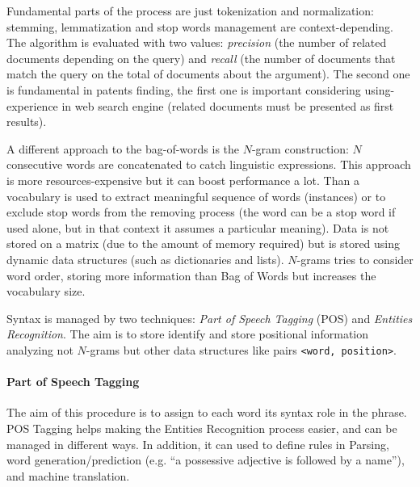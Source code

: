 \documentclass[11pt, a4page]{article}
\begin{document}
Fundamental parts of the process are just tokenization and normalization: stemming, lemmatization and stop words management are context-depending.
The algorithm is evaluated with two values: \textit{precision} (the number of related documents depending on the query) and \textit{recall} (the number of documents that match the query on the total of documents about the argument).
The second one is fundamental in patents finding, the first one is important considering using-experience in web search engine (related documents must be presented as first results). \newline

A different approach to the bag-of-words is the $N$-gram construction: $N$ consecutive words are concatenated to catch linguistic expressions.
This approach is more resources-expensive but it can boost performance a lot.
Than a vocabulary is used to extract meaningful sequence of words (instances) or to exclude stop words from the removing process (the word can be a stop word if used alone, but in that context it assumes a particular meaning).
Data is not stored on a matrix (due to the amount of memory required) but is stored using dynamic data structures (such as dictionaries and lists).
$N$-grams tries to consider word order, storing more information than Bag of Words but increases the vocabulary size. \newline

Syntax is managed by two techniques: \textit{Part of Speech Tagging} (POS) and \textit{Entities Recognition}.
The aim is to store identify and store positional information analyzing not $N$-grams but other data structures like pairs \verb|<word, position>|.

\paragraph{Part of Speech Tagging}
The aim of this procedure is to assign to each word its syntax role in the phrase.
POS Tagging helps making the Entities Recognition process easier, and can be managed in different ways.
In addition, it can used to define rules in Parsing, word generation/prediction (e.g. ``a possessive adjective is followed by a name''), and machine translation.
\end{document}
